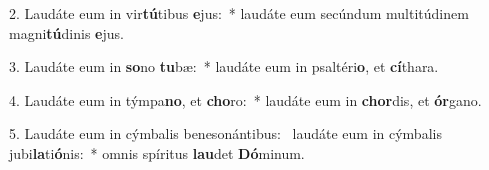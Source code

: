 2. Laudáte eum in vir\textbf{tú}tibus \textbf{e}jus:~*  laudáte eum secúndum multitúdinem magni\textbf{tú}dinis \textbf{e}jus.\

3. Laudáte eum in \textbf{so}no \textbf{tu}bæ:~*  laudáte eum in psaltéri\textbf{o}, et \textbf{cí}thara.\

4. Laudáte eum in týmpa\textbf{no}, et \textbf{cho}ro:~*  laudáte eum in \textbf{chor}dis, et \textbf{ór}gano.\

5. Laudáte eum in cýmbalis benesonántibus: \dag\  laudáte eum in cýmbalis jubi\textbf{la}ti\textbf{ó}nis:~*  omnis spíritus \textbf{lau}det \textbf{Dó}minum.\


